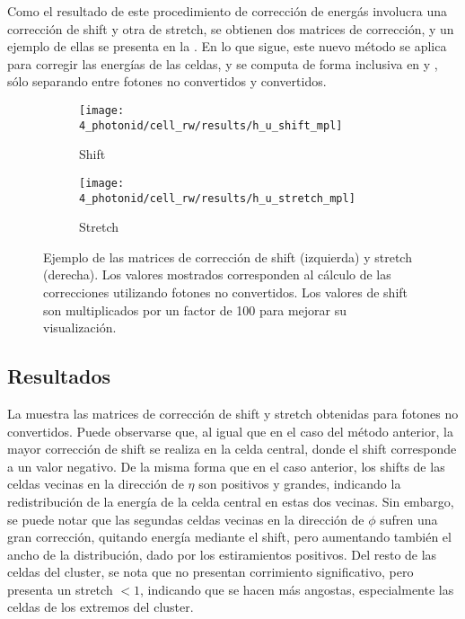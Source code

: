 Como el resultado de este procedimiento de correcci\'on de energ\'as involucra una correcci\'on de shift y otra de stretch, se obtienen dos matrices de correcci\'on, y un ejemplo de ellas se presenta en la \Fig{\ref{fig:ss_corrections:cell_rw:calculation:new:reweights}}.
En lo que sigue, este nuevo método se aplica para corregir las energías de las celdas, y se computa de forma inclusiva en \pt y \abseta, sólo separando entre fotones no convertidos y convertidos.

\begin{figure}[ht!]
    \centering
    \begin{subfigure}[h]{0.49\linewidth}
        \centering
        \texttt{[image: 4\_photonid/cell\_rw/results/h\_u\_shift\_mpl]}
        \caption{Shift}
    \end{subfigure}
    \hfill
    \begin{subfigure}[h]{0.49\linewidth}
        \centering
        \texttt{[image: 4\_photonid/cell\_rw/results/h\_u\_stretch\_mpl]}
        \caption{Stretch}
    \end{subfigure}
    \caption{Ejemplo de las matrices de correcci\'on de shift (izquierda) y stretch (derecha). Los valores mostrados corresponden al c\'alculo de las correcciones utilizando fotones no convertidos. Los valores de shift son multiplicados por un factor de 100 para mejorar su visualizaci\'on.}
    \label{fig:ss_corrections:cell_rw:calculation:new:reweights}
\end{figure}









\subsection{Resultados}
\label{subsec:ss_corrections:cell_rw:results}

La \Fig{\ref{fig:ss_corrections:cell_rw:calculation:new:reweights}} muestra las matrices de correcci\'on de shift y stretch obtenidas para fotones no convertidos. Puede observarse que, al igual que en el caso del m\'etodo anterior, la mayor corrección de shift se realiza en la celda central, donde el shift corresponde a un valor negativo. De la misma forma que en el caso anterior, los shifts de las celdas vecinas en la direcci\'on de \(\eta\) son positivos y grandes, indicando la redistribuci\'on de la energ\'ia de la celda central en estas dos vecinas.
Sin embargo, se puede notar que las segundas celdas vecinas en la direcci\'on de \(\phi\) sufren una gran correcci\'on, quitando energ\'ia mediante el shift, pero aumentando tambi\'en el ancho de la distribuci\'on, dado por los estiramientos positivos. Del resto de las celdas del cluster, se nota que no presentan corrimiento significativo, pero presenta un stretch \(<1\), indicando que se hacen m\'as angostas, especialmente las celdas de los extremos del cluster.

